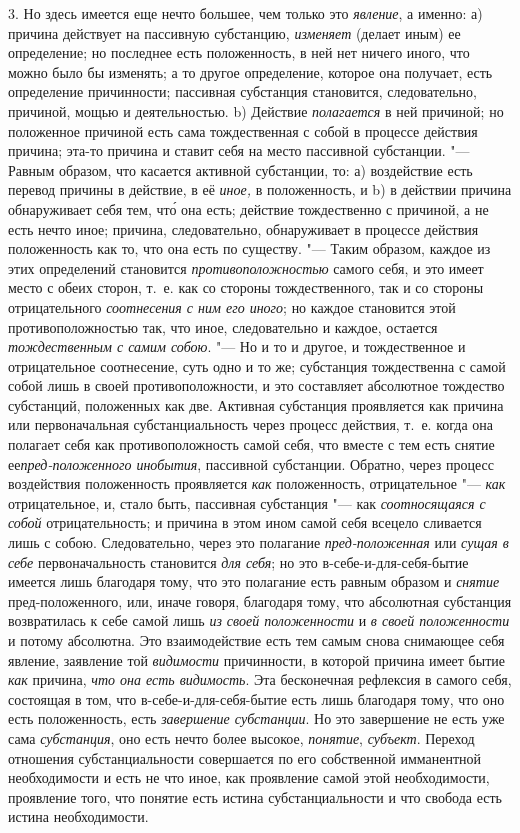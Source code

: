 3. Но здесь имеется еще нечто большее, чем только это {\em явление}, а именно:
а) причина действует на пассивную субстанцию, {\em изменяет} (делает
иным) ее определение; но последнее есть положенность, в ней нет ничего
иного, что можно было бы изменять; а то другое определение, которое она
получает, есть определение причинности; пассивная субстанция становится,
следовательно, причиной, мощью и деятельностью. b) Действие {\em полагается}
в ней причиной; но положенное причиной есть сама тождественная с собой в
процессе действия причина; эта-то причина и ставит себя на место пассивной
субстанции. "--- Равным образом, что касается активной субстанции, то:
а) воздействие есть перевод причины в действие, в её {\em иное,} в
положенность, и b) в действии причина обнаруживает себя тем, чт\'{о} она есть;
действие тождественно с причиной, а не есть нечто иное; причина,
следовательно, обнаруживает в процессе действия положенность как то, что
она есть по существу. "--- Таким образом, каждое из этих
определений становится {\em противоположностью}
самого себя, и это имеет место с обеих сторон, т.~е. как со стороны
тождественного, так и со стороны отрицательного {\em соотнесения с ним его
иного}; но каждое становится этой противоположностью так, что иное,
следовательно и каждое, остается {\em тождественным с самим собою}. "--- Но и
то и другое, и тождественное и отрицательное соотнесение, суть одно и то же;
субстанция тождественна с самой собой лишь в своей противоположности, и это
составляет абсолютное тождество субстанций, положенных как две. Активная
субстанция проявляется как причина или первоначальная субстанциальность
через процесс действия, т.~е. когда она полагает себя как противоположность
самой себя, что вместе с тем есть снятие ее{\em пред-положенного инобытия},
пассивной субстанции. Обратно, через процесс воздействия положенность
проявляется {\em как} положенность, отрицательное "--- {\em как} отрицательное,
и, стало быть, пассивная субстанция "--- как {\em соотносящаяся с собой}
отрицательность; и причина в этом ином самой себя всецело сливается лишь с
собою. Следовательно, через это полагание {\em пред-положенная} или
{\em сущая в себе} первоначальность становится {\em для себя}; но это
в-себе-и-для-себя-бытие имеется лишь благодаря тому, что это полагание есть
равным образом и {\em снятие} пред-положенного, или, иначе говоря, благодаря
тому, что абсолютная субстанция возвратилась к себе самой лишь {\em из своей
положенности} и {\em в своей положенности} и потому абсолютна. Это
взаимодействие есть тем самым снова снимающее себя явление, заявление той
{\em видимости} причинности, в которой причина имеет бытие {\em как} причина,
{\em что она есть видимость}. Эта бесконечная рефлексия в самого себя,
состоящая в том, что в-себе-и-для-себя-бытие есть лишь благодаря тому, что
оно есть положенность, есть {\em завершение субстанции}. Но это завершение
не есть уже сама {\em субстанция}, оно есть нечто более высокое, {\em понятие},
{\em субъект}. Переход отношения субстанциальности совершается по его
собственной имманентной необходимости и есть не что иное, как проявление
самой этой необходимости, проявление того, что понятие есть истина
субстанциальности и что свобода есть истина необходимости.


